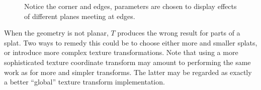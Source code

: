 \documentclass[10pt,conference,compsocconf]{IEEEtran}
\begin{document}
\begin{figure}[htb]
  \centering
  \caption{\label{fig:LargeSplatsOnCorners}
  Notice the corner and edges, parameters are chosen to display effects of
  different planes meeting at edges.}
\end{figure}

When the geometry is not planar, $T$ produces the wrong result for parts of a
splat.  Two ways to remedy this could be to choose either more and smaller
splats, or introduce more complex texture transformations. Note that using a
more sophisticated texture coordinate transform may amount to performing the
same work as for more and simpler transforms. The latter may be regarded as
exactly a better ``global'' texture transform implementation.
\end{document}

